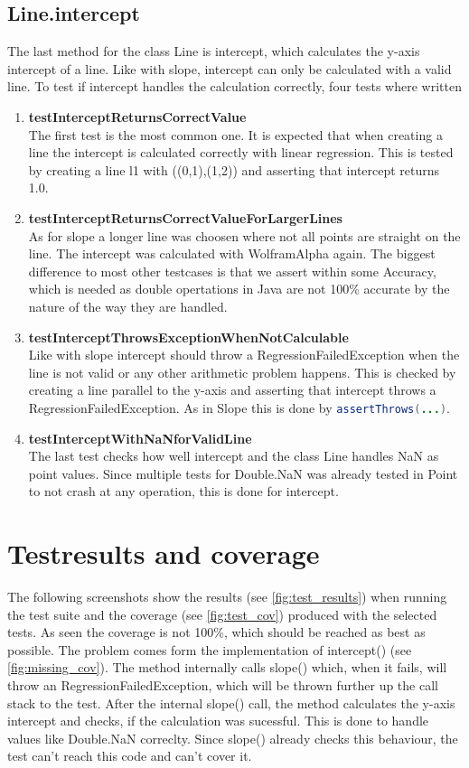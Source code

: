\subsection{Line.intercept}
The last method for the class Line is intercept, which calculates the y-axis intercept of a line. Like with slope, intercept can only be calculated with a valid line. To test if intercept handles the calculation correctly, four tests where written
\begin{enumerate}
    \item \textbf{testInterceptReturnsCorrectValue} \\
    The first test is the most common one. It is expected that when creating a line the intercept is calculated correctly with linear regression. This is tested by creating a line l1 with ((0,1),(1,2)) and asserting that intercept returns 1.0.
    \item \textbf{testInterceptReturnsCorrectValueForLargerLines} \\
    As for slope a longer line was choosen where not all points are straight on the line. The intercept was calculated with WolframAlpha again. The biggest difference to most other testcases is that we assert within some Accuracy, which is needed as double opertations in Java are not 100\% accurate by the nature of the way they are handled.
    \item \textbf{testInterceptThrowsExceptionWhenNotCalculable} \\
    Like with slope intercept should throw a RegressionFailedException when the line is not valid or any other arithmetic problem happens. This is checked by creating a line parallel to the y-axis and asserting that intercept throws a RegressionFailedException. As in Slope this is done by \lstinline[language=java]{assertThrows(...)}.
    \item \textbf{testInterceptWithNaNforValidLine} \\
    The last test checks how well intercept and the class Line handles NaN as point values. Since multiple tests for Double.NaN was already tested in Point to not crash at any operation, this is done for intercept.
\end{enumerate}

\section{Testresults and coverage}

The following screenshots show the results (see \ref{fig:test_results}) when running the test suite and the coverage (see \ref{fig:test_cov}) produced with the selected tests. As seen the coverage is not 100\%, which should be reached as best as possible. The problem comes form the implementation of intercept() (see \ref{fig:missing_cov}). The method internally calls slope() which, when it fails, will throw an RegressionFailedException, which will be thrown further up the call stack to the test. After the internal slope() call, the method calculates the y-axis intercept and checks, if the calculation was sucessful. This is done to handle values like Double.NaN correclty. Since slope() already checks this behaviour, the test can't reach this code and can't cover it. 

